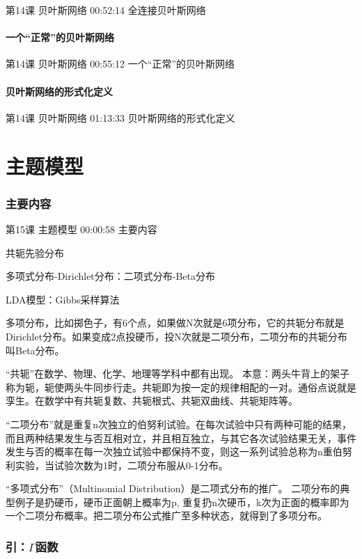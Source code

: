 \documentclass[UTF8]{ctexbook}
\begin{document}
第14课 贝叶斯网络 00:52:14 全连接贝叶斯网络

\subsubsection{一个“正常”的贝叶斯网络}

第14课 贝叶斯网络 00:55:12 一个“正常”的贝叶斯网络

\subsubsection{贝叶斯网络的形式化定义}

第14课 贝叶斯网络 01:13:33 贝叶斯网络的形式化定义

\chapter{主题模型}

\subsection{主要内容}

第15课 主题模型 00:00:58 主要内容

共轭先验分布

多项式分布-Dirichlet分布：二项式分布-Beta分布

LDA模型：Gibbs采样算法

多项分布，比如掷色子，有6个点，如果做N次就是6项分布，它的共轭分布就是Dirichlet分布。如果变成2点投硬币，投N次就是二项分布，二项分布的共轭分布叫Beta分布。

“共轭”在数学、物理、化学、地理等学科中都有出现。 本意：两头牛背上的架子称为轭，轭使两头牛同步行走。共轭即为按一定的规律相配的一对。通俗点说就是孪生。在数学中有共轭复数、共轭根式、共轭双曲线、共轭矩阵等。

“二项分布”就是重复n次独立的伯努利试验。在每次试验中只有两种可能的结果，而且两种结果发生与否互相对立，并且相互独立，与其它各次试验结果无关，事件发生与否的概率在每一次独立试验中都保持不变，则这一系列试验总称为n重伯努利实验，当试验次数为1时，二项分布服从0-1分布。

“多项式分布”（Multinomial Distribution）是二项式分布的推广。
二项分布的典型例子是扔硬币，硬币正面朝上概率为p, 重复扔n次硬币，k次为正面的概率即为一个二项分布概率。把二项分布公式推广至多种状态，就得到了多项分布。

\subsection{引：$\Gamma$函数}
\end{document}
